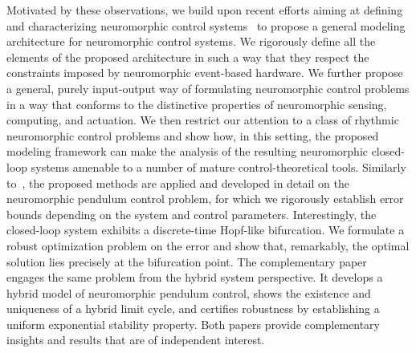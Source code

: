 \documentclass{article}
\theoremstyle{definition}
\theoremstyle{remark}
\begin{document}
Motivated by these observations, we build upon recent efforts aiming at defining and characterizing neuromorphic control systems~\cite{fernandez2023neuromorphic,schmetterling2024} to propose a general modeling architecture for neuromorphic control systems. We rigorously define all the elements of the proposed architecture in such a way that they respect the constraints imposed by neuromorphic event-based hardware. We further propose a general, purely input-output way of formulating neuromorphic control problems in a way that conforms to the distinctive properties of neuromorphic sensing, computing, and actuation. We then restrict our attention to a class of rhythmic neuromorphic control problems and show how, in this setting, the proposed modeling framework can make the analysis of the resulting neuromorphic closed-loop systems amenable to a number of mature control-theoretical tools. Similarly to~\cite{fernandez2023neuromorphic,schmetterling2024}, the proposed methods are applied and developed in detail on the neuromorphic pendulum control problem, for which we rigorously establish error bounds depending on the system and control parameters. Interestingly, the closed-loop system exhibits a discrete-time Hopf-like bifurcation. We formulate a robust optimization problem on the error and show that, remarkably, the optimal solution lies precisely at the bifurcation point. The complementary paper~\cite{petri2025} engages the same problem from the hybrid system perspective. It develops a hybrid model of neuromorphic pendulum control, shows the existence and uniqueness of a hybrid limit cycle, and certifies robustness by establishing a uniform exponential stability property. Both papers provide complementary insights and results that are of independent interest.

\end{document}
